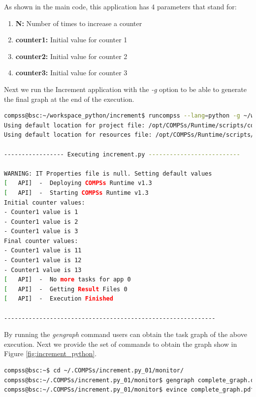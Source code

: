 As shown in the main code, this application has 4 parameters that stand for:

\begin{enumerate}
 \item \textbf{N:} Number of times to increase a counter
 \item \textbf{counter1:} Initial value for counter 1
 \item \textbf{counter2:} Initial value for counter 2
 \item \textbf{counter3:} Initial value for counter 3
\end{enumerate}

Next we run the Increment application with the \textit{-g} option to be able to generate the final graph at the end of the execution.

\begin{lstlisting}[language=bash]
compss@bsc:~/workspace_python/increment$ runcompss --lang=python -g ~/workspace_python/increment/increment.py 10 1 2 3
Using default location for project file: /opt/COMPSs/Runtime/scripts/configuration/xml/projects/project.xml
Using default location for resources file: /opt/COMPSs/Runtime/scripts/configuration/xml/resources/resources.xml

----------------- Executing increment.py --------------------------

WARNING: IT Properties file is null. Setting default values
[   API]  -  Deploying COMPSs Runtime v1.3
[   API]  -  Starting COMPSs Runtime v1.3
Initial counter values:
- Counter1 value is 1
- Counter1 value is 2
- Counter1 value is 3
Final counter values:
- Counter1 value is 11
- Counter1 value is 12
- Counter1 value is 13
[   API]  -  No more tasks for app 0
[   API]  -  Getting Result Files 0
[   API]  -  Execution Finished

------------------------------------------------------------
\end{lstlisting}

By running the \textit{gengraph} command users can obtain the task graph of the above execution. Next we provide the set of commands
to obtain the graph show in Figure \ref{fig:increment_python}.

\begin{lstlisting}[language=bash]
compss@bsc:~$ cd ~/.COMPSs/increment.py_01/monitor/
compss@bsc:~/.COMPSs/increment.py_01/monitor$ gengraph complete_graph.dot
compss@bsc:~/.COMPSs/increment.py_01/monitor$ evince complete_graph.pdf
\end{lstlisting}


